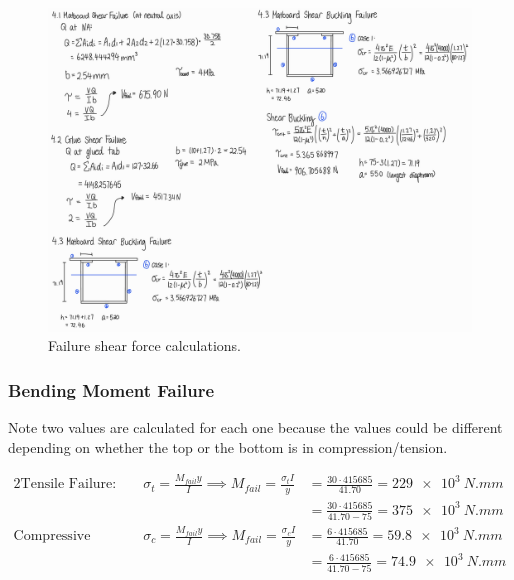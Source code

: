 \documentclass{article}
\begin{document}
\begin{figure}[H]
    \centering
    \includegraphics[width=\textwidth]{shear.png}
    \caption{Failure shear force calculations.}
\end{figure}

\subsubsection{Bending Moment Failure}

Note two values are calculated for each one because the values could be different depending on whether the top or the
bottom is in compression/tension.

\begin{alignat*}{2}
    \text{Tensile Failure: }&\sigma_t = \frac{M_{fail}y}{I} \implies M_{fail} = \frac{\sigma_t I}{y} &= \frac{30 \cdot 415685}{41.70} = \SI{229e3}{N.mm} \\
        & &= \frac{30 \cdot 415685}{41.70 - 75} = \SI{375e3}{N.mm} \\
    \text{Compressive Failure: }&\sigma_c = \frac{M_{fail}y}{I} \implies M_{fail} = \frac{\sigma_c I}{y} &= \frac{6 \cdot 415685}{41.70} = \SI{59.8e3}{N.mm} \\
        & &= \frac{6 \cdot 415685}{41.70 - 75} = \SI{74.9e3}{N.mm} \\
\end{alignat*}
\end{document}
